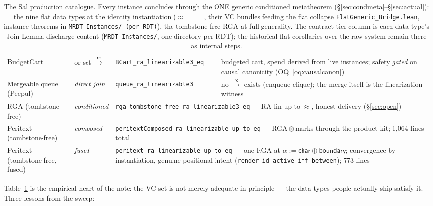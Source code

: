 \documentclass[11pt]{article}
\newcommand{\rc}{\xrightarrow{\mathsf{rc}}}
\newcommand{\lean}[1]{\texttt{#1}}
\newcommand{\eqobs}{\approx}
\begin{document}
\begin{table}[t]
{\begin{tabular}{@{}llll@{}}
BudgetCart & or-set $\rc$ & \lean{BCart\_ra\_linearizable3\_eq} & budgeted cart, spend derived from live instances; safety \emph{gated} on causal canonicity (OQ~\ref{oq:causalcanon}) \\
Mergeable queue (Peepul) & \emph{direct join} & \lean{queue\_ra\_linearizable3} & no $\rc$ exists (enqueue clique); the merge itself is the linearization witness \\
RGA (tombstone-free) & \emph{conditioned} & \multicolumn{2}{l}{\lean{rga\_tombstone\_free\_ra\_linearizable3\_eq} --- RA-lin up to $\approx$, honest delivery (\S\ref{sec:open})} \\
Peritext (tombstone-free) & \emph{composed} & \multicolumn{2}{l}{\lean{peritextComposed\_ra\_linearizable\_up\_to\_eq} --- RGA${}\otimes{}$marks through the product kit; 1{,}064 lines total} \\
Peritext (tombstone-free, fused) & \emph{fused} & \multicolumn{2}{l}{\lean{peritext\_ra\_linearizable\_up\_to\_eq} --- one RGA at $\alpha := \mathsf{char} \oplus \mathsf{boundary}$; convergence by instantiation, genuine positional intent (\lean{render\_id\_active\_iff\_between}); 773 lines} \\
\bottomrule
\end{tabular}}
\caption{The Sal production catalogue. Every instance concludes through
the ONE generic conditioned metatheorem
(\S\ref{sec:condmeta}--\S\ref{sec:actual}): the nine flat data types at
the identity instantiation ($\eqobs = {=}$, their VC bundles feeding the
flat collapse \lean{FlatGeneric\_Bridge.lean}, instance theorems in
\lean{MRDT\_Instances/ (per-RDT)}), the tombstone-free RGA at full
generality. The contract-tier column is each data type's Join-Lemma
discharge content (\lean{MRDT\_Instances/}, one directory per RDT); the historical flat
corollaries over the raw system remain there as internal steps.}
\label{tab:catalog}
\end{table}

Table~\ref{tab:catalog} is the empirical heart of the note: the VC set is
not merely adequate in principle --- the data types people actually ship
satisfy it. Three lessons from the sweep:
\end{document}
